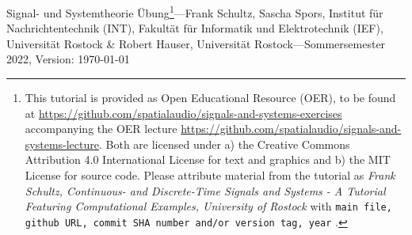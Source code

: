 \documentclass[11pt,a4paper,DIV=12]{scrartcl}
\begin{document}
%
\noindent Signal- und Systemtheorie Übung\footnote{This tutorial is provided as
Open Educational Resource (OER), to be found at
\url{https://github.com/spatialaudio/signals-and-systems-exercises}
accompanying the OER lecture
\url{https://github.com/spatialaudio/signals-and-systems-lecture}.
%
Both are licensed under a) the Creative Commons Attribution 4.0 International
License for text and graphics and b) the MIT License for source code.
%
Please attribute material from the tutorial as \textit{Frank Schultz,
Continuous- and Discrete-Time Signals and Systems - A Tutorial Featuring
Computational Examples, University of Rostock} with
\texttt{main file, github URL, commit SHA number and/or version tag, year}
.}---Frank Schultz, Sascha Spors,
Institut für Nachrichtentechnik (INT),
Fakultät für Informatik und Elektrotechnik (IEF),
Universität Rostock \&
Robert Hauser, Universität Rostock---Sommersemester 2022, Version: \today
\end{document}
